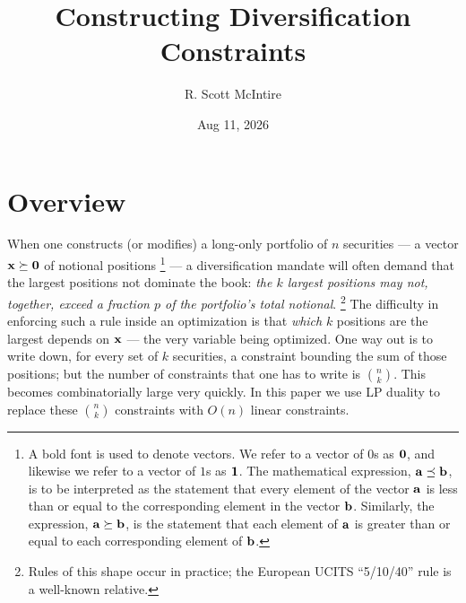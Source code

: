 \documentclass[12pt]{article}
\title{Constructing Diversification Constraints}
\author{R. Scott McIntire}
\date{Aug 11, 2026}
\begin{document}
\maketitle

\section{Overview}
When one constructs (or modifies) a long-only portfolio of $n$ securities
--- a vector ${\bf x} \succeq {\bf 0}$ of notional positions%
\footnote{A bold font is used to denote vectors. We refer to a
vector of $0$s as ${\bf 0}$, and likewise we refer to a vector of $1$s
as ${\bf 1}$. The mathematical expression, ${\bf a} \preceq {\bf b}$, is to be
interpreted as the statement that every element of the vector ${\bf a}$ is
less than or equal to the corresponding element in the vector ${\bf b}$.
Similarly, the expression, ${\bf a} \succeq {\bf b}$, is the statement that
each element of ${\bf a}$ is greater than or equal to each
corresponding element of ${\bf b}$.
}
--- a diversification mandate will often demand that the largest positions
not dominate the book: {\it the $k$ largest positions may not, together,
exceed a fraction $p$ of the portfolio's total notional}.%
\footnote{Rules of this shape occur in practice; the European UCITS
``5/10/40'' rule is a well-known relative.}
The difficulty in enforcing such a rule inside an optimization is that
{\it which\/} $k$ positions are the largest depends on ${\bf x}$ --- the
very variable being optimized. One way out is to write down, for every
set of $k$ securities, a constraint bounding the sum of those positions;
but the number of constraints that one has to write is $\binom{n}{k}$.
This becomes combinatorially large very quickly. In this paper we use LP
duality to replace these $\binom{n}{k}$ constraints with $O(n)$ linear
constraints.
\end{document}
